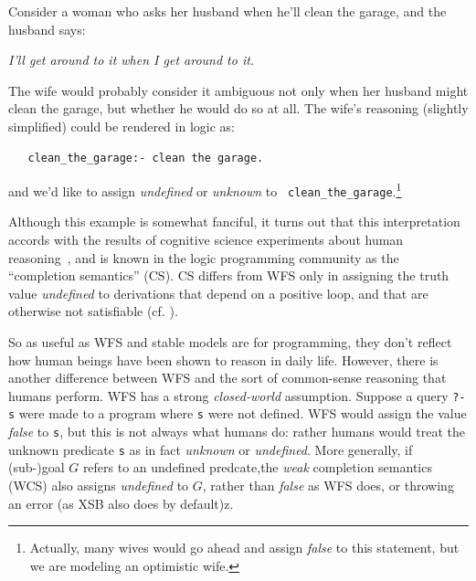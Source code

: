 Consider a woman who asks her husband when he'll clean the garage, and
the husband says:

{\em I'll get around to it when I get around to it.}

The wife would probably consider it ambiguous not only when her
husband might clean the garage, but whether he would do so at all.
The wife's reasoning (slightly simplified) could be rendered in logic
as:

\begin{verbatim}
   clean_the_garage:- clean the garage.
\end{verbatim}
\noindent
and we'd like to assign {\em undefined} or {\em unknown} to {\tt
  clean\_the\_garage}.\footnote{Actually, many wives would
  go ahead and assign {\em false} to this statement, but we are
  modeling an optimistic wife.}

Although this example is somewhat fanciful, it turns out that this
interpretation accords with the results of cognitive science
experiments about human reasoning~\cite{SteV08}, and is known in the
logic programming community as the ``completion semantics'' (CS).  CS
differs from WFS only in assigning the truth value {\em undefined} to
derivations that depend on a positive loop, and that are otherwise not
satisfiable (cf. \cite{Lloy84}).


So as useful as WFS and stable models are for programming, they don't
reflect how human beings have been shown to reason in daily life.
However, there is another difference between WFS and the sort of
common-sense reasoning that humans perform.  WFS has a strong {\em
  closed-world} assumption.  Suppose a query {\tt ?- s} were made to a
program where {\tt s} were not defined.  WFS would assign the value
{\em false} to {\tt s}, but this is not always what humans do: rather
humans would treat the unknown predicate {\tt s} as in fact {\em
  unknown} or {\em undefined}.  More generally, if (sub-)goal $G$
refers to an undefined predcate,the {\em weak} completion semantics
(WCS) also assigns {\em undefined} to $G$, rather than {\em false} as
WFS does, or throwing an error (as XSB also does by default)z.


